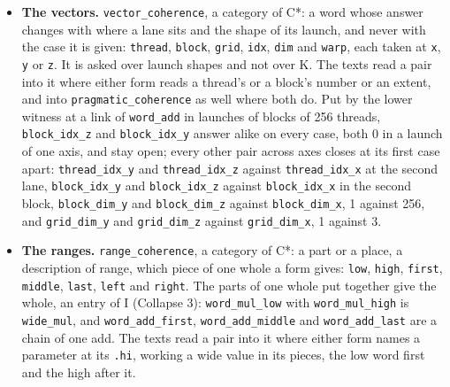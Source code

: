 \begin{itemize}
\item \textbf{The vectors.} \texttt{vector\_\allowbreak{}coherence}, a category of C*: a word whose answer changes with where a lane sits and the shape of its launch, and never with the case it is given: \texttt{thread}, \texttt{block}, \texttt{grid}, \texttt{idx}, \texttt{dim} and \texttt{warp}, each taken at \texttt{x}, \texttt{y} or \texttt{z}. It is asked over launch shapes and not over K. The texts read a pair into it where either form reads a thread's or a block's number or an extent, and into \texttt{pragmatic\_\allowbreak{}coherence} as well where both do. Put by the lower witness at a link of \texttt{word\_\allowbreak{}add} in launches of blocks of 256 threads, \texttt{block\_\allowbreak{}idx\_\allowbreak{}z} and \texttt{block\_\allowbreak{}idx\_\allowbreak{}y} answer alike on every case, both 0 in a launch of one axis, and stay open; every other pair across axes closes at its first case apart: \texttt{thread\_\allowbreak{}idx\_\allowbreak{}y} and \texttt{thread\_\allowbreak{}idx\_\allowbreak{}z} against \texttt{thread\_\allowbreak{}idx\_\allowbreak{}x} at the second lane, \texttt{block\_\allowbreak{}idx\_\allowbreak{}y} and \texttt{block\_\allowbreak{}idx\_\allowbreak{}z} against \texttt{block\_\allowbreak{}idx\_\allowbreak{}x} in the second block, \texttt{block\_\allowbreak{}dim\_\allowbreak{}y} and \texttt{block\_\allowbreak{}dim\_\allowbreak{}z} against \texttt{block\_\allowbreak{}dim\_\allowbreak{}x}, 1 against 256, and \texttt{grid\_\allowbreak{}dim\_\allowbreak{}y} and \texttt{grid\_\allowbreak{}dim\_\allowbreak{}z} against \texttt{grid\_\allowbreak{}dim\_\allowbreak{}x}, 1 against 3.
\item \textbf{The ranges.} \texttt{range\_\allowbreak{}coherence}, a category of C*: a part or a place, a description of range, which piece of one whole a form gives: \texttt{low}, \texttt{high}, \texttt{first}, \texttt{middle}, \texttt{last}, \texttt{left} and \texttt{right}. The parts of one whole put together give the whole, an entry of I (Collapse 3): \texttt{word\_\allowbreak{}mul\_\allowbreak{}low} with \texttt{word\_\allowbreak{}mul\_\allowbreak{}high} is \texttt{wide\_\allowbreak{}mul}, and \texttt{word\_\allowbreak{}add\_\allowbreak{}first}, \texttt{word\_\allowbreak{}add\_\allowbreak{}middle} and \texttt{word\_\allowbreak{}add\_\allowbreak{}last} are a chain of one add. The texts read a pair into it where either form names a parameter at its \texttt{.\allowbreak{}hi}, working a wide value in its pieces, the low word first and the high after it.

\end{itemize}
